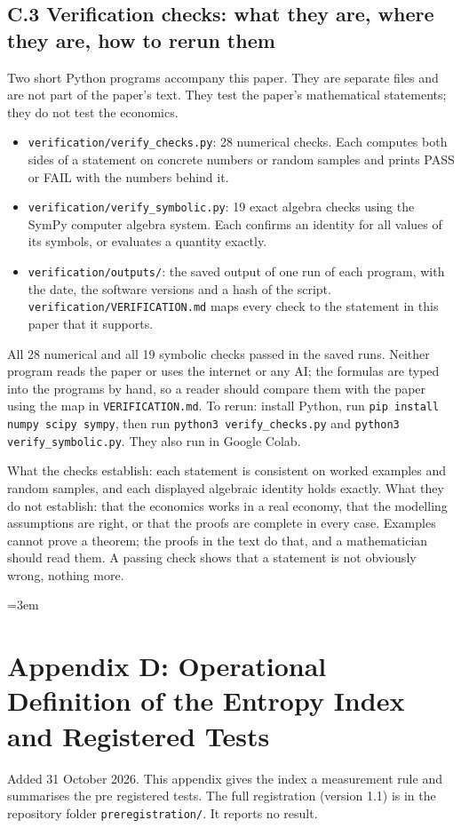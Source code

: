 \documentclass[11pt,a4paper]{article}
\theoremstyle{definition}
\theoremstyle{plain}
\theoremstyle{remark}
\begin{document}
\subsection*{C.3 Verification checks: what they are, where they are, how to rerun them}
Two short Python programs accompany this paper. They are separate files and are not part of the paper's text. They test the paper's mathematical statements; they do not test the economics.
\begin{itemize}
\item \texttt{verification/verify\_checks.py}: 28 numerical checks. Each computes both sides of a statement on concrete numbers or random samples and prints PASS or FAIL with the numbers behind it.
\item \texttt{verification/verify\_symbolic.py}: 19 exact algebra checks using the SymPy computer algebra system. Each confirms an identity for all values of its symbols, or evaluates a quantity exactly.
\item \texttt{verification/outputs/}: the saved output of one run of each program, with the date, the software versions and a hash of the script. \texttt{verification/VERIFICATION.md} maps every check to the statement in this paper that it supports.
\end{itemize}
All 28 numerical and all 19 symbolic checks passed in the saved runs. Neither program reads the paper or uses the internet or any AI; the formulas are typed into the programs by hand, so a reader should compare them with the paper using the map in \texttt{VERIFICATION.md}. To rerun: install Python, run \texttt{pip install numpy scipy sympy}, then run \texttt{python3 verify\_checks.py} and \texttt{python3 verify\_symbolic.py}. They also run in Google Colab.

What the checks establish: each statement is consistent on worked examples and random samples, and each displayed algebraic identity holds exactly. What they do not establish: that the economics works in a real economy, that the modelling assumptions are right, or that the proofs are complete in every case. Examples cannot prove a theorem; the proofs in the text do that, and a mathematician should read them. A passing check shows that a statement is not obviously wrong, nothing more.

\clearpage
\begingroup{}   \emergencystretch=3em
\section*{Appendix D: Operational Definition of the Entropy Index and Registered Tests}
Added 31 October 2026. This appendix gives the index a measurement rule and summarises the pre registered tests. The full registration (version 1.1) is in the repository folder \texttt{preregistration/}. It reports no result.
\end{document}
